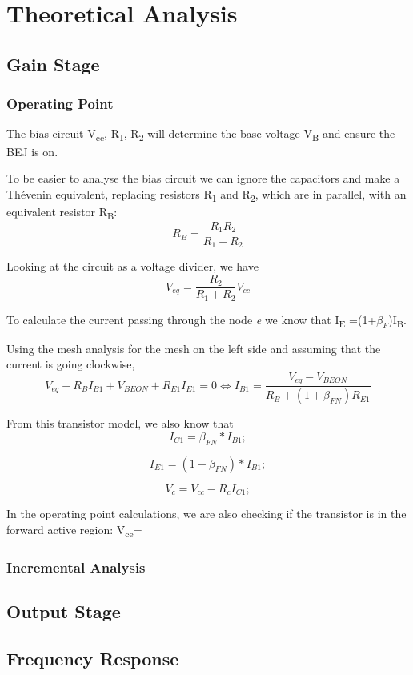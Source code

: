 \section{Theoretical Analysis} \label{sec:analysis}
 


\subsection{Gain Stage}
\subsubsection{Operating Point}
The bias circuit V\textsubscript{cc}, R\textsubscript1, R\textsubscript2 will determine the base voltage V\textsubscript B and ensure the BEJ is on.

To be easier to analyse the bias circuit we can ignore the capacitors and make a Thévenin equivalent, replacing resistors R\textsubscript{1} and R\textsubscript{2}, which are in parallel, with an equivalent resistor R\textsubscript{B}:
\begin{equation}
R_B = \frac{R_{1} R_{2}}{R_{1}+R_{2}}
\end{equation}

Looking at the circuit as a voltage divider, we have
\begin{equation}
V_{eq} = \frac{R_{2}}{R_{1}+R_{2}} V_{cc}
\end{equation}

To calculate the current passing through the node \textit{e} we know that I\textsubscript E =(1+$\beta_F$)I\textsubscript B.

Using the mesh analysis for the mesh on the left side and assuming that the current is going clockwise,
\begin{equation}
V_{eq} + R_B I_{B1} + V_{BEON} + R_{E1} I_{E1} = 0 \Leftrightarrow I_{B1} = \frac{V_{eq}-V_{BEON}}{R_B + (1+\beta_{FN}) R_{E1}}
\end{equation}

From this transistor model, we also know that
\begin{equation}
 I_{C1}=\beta_{FN}*I_{B1};
\end{equation}

\begin{equation}
 I_{E1}=(1+\beta_{FN})*I_{B1};
\end{equation}

\begin{equation}
 V_{c}=V_{cc}-R_{c}I_{C1};
\end{equation}

In the operating point calculations, we are also checking if the transistor is in the forward active region:  V\textsubscript{ce}= 
\subsubsection{Incremental Analysis}
\subsection{Output Stage}

\subsection{Frequency Response}




